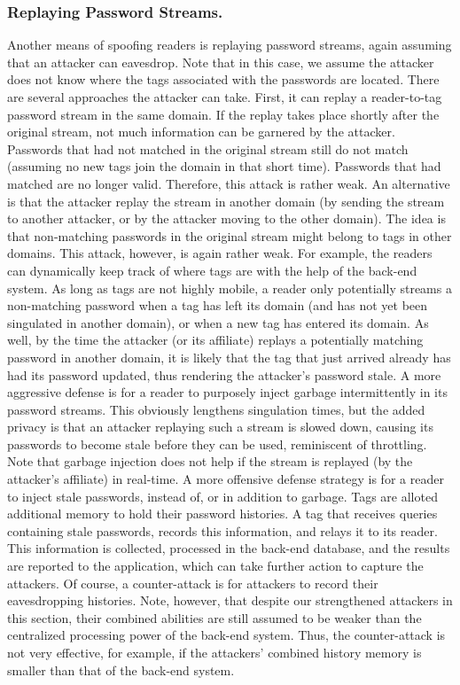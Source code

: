 \subsubsection{Replaying Password Streams.}
Another means of spoofing readers is replaying password streams, again assuming that an attacker can eavesdrop.  Note that in this case, we assume the attacker does not know where the tags associated with the passwords are located.  There are several approaches the attacker can take.  First, it can replay a reader-to-tag password stream in the same domain.  If the replay takes place shortly after the original stream, not much information can be garnered by the attacker.  Passwords that had not matched in the original stream still do not match (assuming no new tags join the domain in that short time).  Passwords that had matched are no longer valid.  Therefore, this attack is rather weak.  An alternative is that the attacker replay the stream in another domain (by sending the stream to another attacker, or by the attacker moving to the other domain).  The idea is that non-matching passwords in the original stream might belong to tags in other domains.  This attack, however, is again rather weak.  For example, the readers can dynamically keep track of where tags are with the help of the back-end system.  As long as tags are not highly mobile, a reader only potentially streams a non-matching password when a tag has left its domain (and has not yet been singulated in another domain), or when a new tag has entered its domain.  As well, by the time the attacker (or its affiliate) replays a potentially matching password in another domain, it is likely that the tag that just arrived already has had its password updated, thus rendering the attacker's password stale.  A more aggressive defense is for a reader to purposely inject garbage intermittently in its password streams.  This obviously lengthens singulation times, but the added privacy is that an attacker replaying such a stream is slowed down, causing its passwords to become stale before they can be used, reminiscent of throttling.  Note that garbage injection does not help if the stream is replayed (by the attacker's affiliate) in real-time.  A more offensive defense strategy is for a reader to inject stale passwords, instead of, or in addition to garbage.  Tags are alloted additional memory to hold their password histories.  A tag that receives queries containing stale passwords, records this information, and relays it to its reader.  This information is collected, processed in the back-end database, and the results are reported to the application, which can take further action to capture the attackers.  Of course, a counter-attack is for attackers to record their eavesdropping histories.  Note, however, that despite our strengthened attackers in this section, their combined abilities are still assumed to be weaker than the centralized processing power of the back-end system.  Thus, the counter-attack is not very effective, for example, if the attackers' combined history memory is smaller than that of the back-end system.

